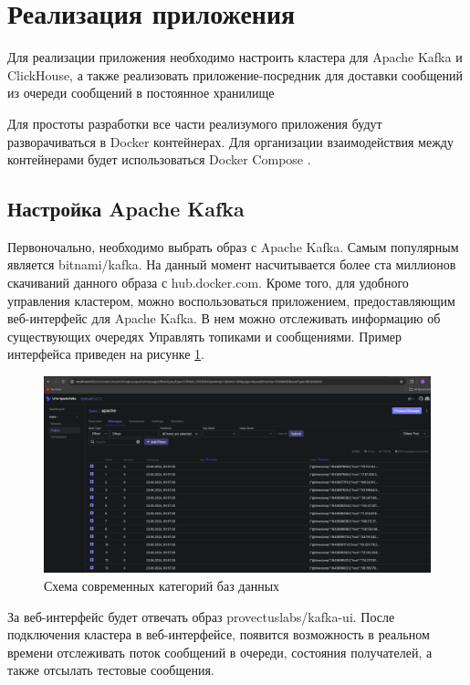 \documentclass[14pt, russian]{scrartcl}
\begin{document}
\section{Реализация приложения}

Для реализации приложения
необходимо настроить
кластера для Apache Kafka
и ClickHouse, а также
реализовать приложение-посредник
для доставки сообщений из очереди
сообщений в постоянное хранилище


Для простоты разработки все части
реализумого приложения будут разворачиваться
в Docker \cite{DockerDocs} контейнерах. Для организации
взаимодействия между контейнерами будет
использоваться Docker Compose \cite{DockerComposeDocs}.

\subsection{Настройка Apache Kafka}

Первоночально, необходимо выбрать образ с Apache Kafka.
Самым популярным является bitnami/kafka. На данный
момент насчитывается более ста миллионов скачиваний данного образа
с hub.docker.com. Кроме того, для удобного
управления кластером, можно воспользоваться
приложением, предоставляющим веб-интерфейс для
Apache Kafka. В нем можно отслеживать информацию об существующих очередях
Управлять топиками и сообщениями. Пример интерфейса приведен на рисунке \ref{fig:kafkaui}.

\begin{figure}[H]
	\centering
	\begin{minipage}[t]{.9\textwidth}
		\centering
		\includegraphics[width=.7\textwidth]{./imgs/kafkaui.png}
	\end{minipage}
	\caption{Схема современных категорий баз данных}
	\label{fig:kafkaui}
\end{figure}

За веб-интерфейс будет отвечать образ provectuslabs/kafka-ui.
После подключения кластера в веб-интерфейсе, появится возможность
в реальном времени отслеживать поток сообщений в очереди,
состояния получателей, а также отсылать тестовые сообщения.
\end{document}
